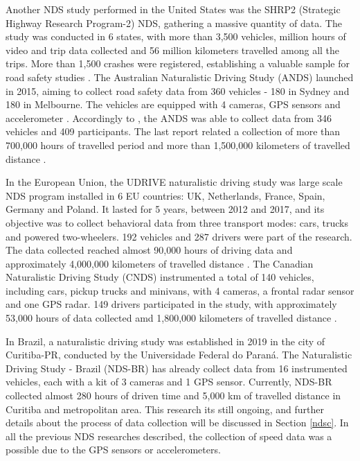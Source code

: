 Another NDS study performed in the United States was the SHRP2 (Strategic Highway Research Program-2) NDS, gathering a massive quantity of data. The study was conducted in 6 states, with more than 3,500 vehicles, million hours of video and trip data collected and 56 million kilometers travelled among all the trips. More than 1,500 crashes were registered, establishing a valuable sample for road safety studies \cite{Njord2015}. The Australian Naturalistic Driving Study (ANDS) launched in 2015, aiming to collect road safety data from 360 vehicles - 180 in Sydney and 180 in Melbourne. The vehicles are equipped with 4 cameras, GPS sensors and accelerometer \cite{ANDS2017a}. Accordingly to \textcite{Larue2019}, the ANDS was able to collect data from 346 vehicles and 409 participants. The last report related a collection of more than 700,000 hours of travelled period and more than 1,500,000 kilometers of travelled distance \cite{ANDS2017a}. 

In the European Union, the UDRIVE naturalistic driving study was large scale NDS program installed in 6 EU countries: UK, Netherlands, France, Spain, Germany and Poland. It lasted for 5 years, between 2012 and 2017, and its objective was to collect behavioral data from three transport modes: cars, trucks and powered two-wheelers. 192 vehicles and 287 drivers were part of the research. The data collected reached almost 90,000 hours of driving data and approximately 4,000,000 kilometers of travelled distance \cite{VanNes2019}. The Canadian Naturalistic Driving Study (CNDS) instrumented a total of 140 vehicles, including cars, pickup trucks and minivans, with 4 cameras, a frontal radar sensor and one GPS radar. 149 drivers participated in the study, with approximately 53,000 hours of data collected amd 1,800,000 kilometers of travelled distance \cite{CNDS2021}. 

In Brazil, a naturalistic driving study was established in 2019 in the city of Curitiba-PR, conducted by the Universidade Federal do Paraná. The Naturalistic Driving Study - Brazil (NDS-BR) has already collect data from 16 instrumented vehicles, each with a kit of 3 cameras and 1 GPS sensor. Currently, NDS-BR collected almost 280 hours of driven time and 5,000 km of travelled distance in Curitiba and metropolitan area. This research its still ongoing, and further details about the process of data collection will be discussed in Section \ref{ndsc}. In all the previous NDS researches described, the collection of speed data was a possible due to the GPS sensors or accelerometers.



